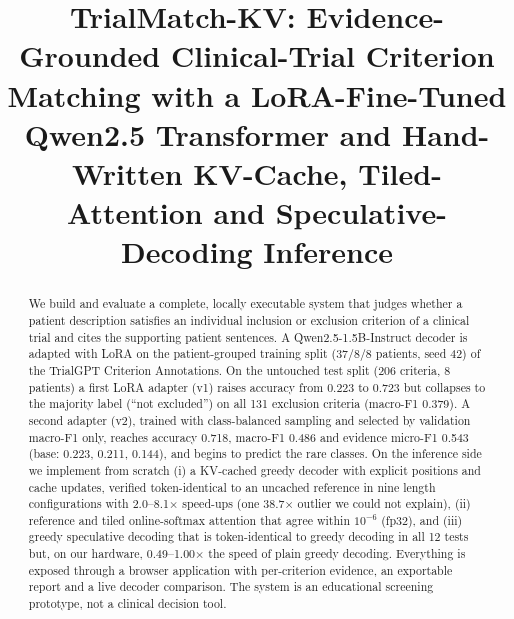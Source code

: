 \documentclass[conference]{IEEEtran}
\begin{document}
\title{TrialMatch-KV: Evidence-Grounded Clinical-Trial Criterion Matching with a LoRA-Fine-Tuned Qwen2.5 Transformer and Hand-Written KV-Cache, Tiled-Attention and Speculative-Decoding Inference}

\author{
}

\maketitle

\begin{abstract}
We build and evaluate a complete, locally executable system that judges whether a patient description satisfies an individual inclusion or exclusion criterion of a clinical trial and cites the supporting patient sentences. A Qwen2.5-1.5B-Instruct decoder is adapted with LoRA on the patient-grouped training split (37/8/8 patients, seed 42) of the TrialGPT Criterion Annotations. On the untouched test split (206 criteria, 8 patients) a first LoRA adapter (v1) raises accuracy from 0.223 to 0.723 but collapses to the majority label (``not excluded'') on all 131 exclusion criteria (macro-F1 0.379). A second adapter (v2), trained with class-balanced sampling and selected by validation macro-F1 only, reaches accuracy 0.718, macro-F1 0.486 and evidence micro-F1 0.543 (base: 0.223, 0.211, 0.144), and begins to predict the rare classes. On the inference side we implement from scratch (i) a KV-cached greedy decoder with explicit positions and cache updates, verified token-identical to an uncached reference in nine length configurations with 2.0--8.1$\times$ speed-ups (one 38.7$\times$ outlier we could not explain), (ii) reference and tiled online-softmax attention that agree within $10^{-6}$ (fp32), and (iii) greedy speculative decoding that is token-identical to greedy decoding in all 12 tests but, on our hardware, 0.49--1.00$\times$ the speed of plain greedy decoding. Everything is exposed through a browser application with per-criterion evidence, an exportable report and a live decoder comparison. The system is an educational screening prototype, not a clinical decision tool.
\end{abstract}
\end{document}
